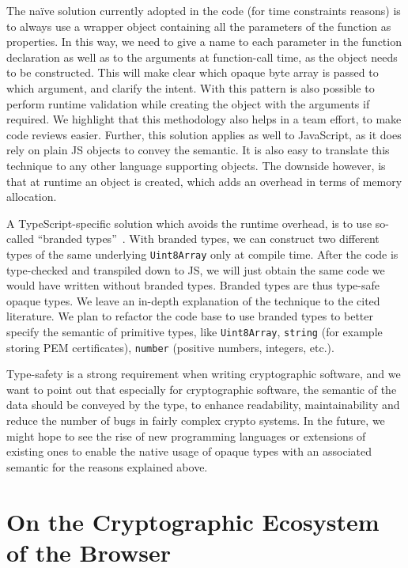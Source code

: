 The na\"ive solution currently adopted in the code (for time constraints reasons)
is to always use a wrapper object containing all the parameters of the function
as properties. In this way, we need to give a name to each parameter
in the function declaration as well as to the arguments at function-call
time, as the object needs to be constructed. This will make clear which
opaque byte array is passed to which argument, and clarify the intent.
With this pattern is also possible to perform runtime validation
while creating the object with the arguments if required.
We highlight that this methodology also helps in a team effort, to make
code reviews easier. Further, this solution applies as well to JavaScript,
as it does rely on plain JS objects to convey the semantic. It is also
easy to translate this technique to any other language supporting objects.
The downside however, is that at runtime an object is created, which adds 
an overhead in terms of memory allocation.

A TypeScript-specific solution which avoids the runtime overhead, is to use
so-called ``branded types''~\cite{vanderkam2019effective, goldberg2022learning}. 
With branded types, we can construct two 
different types of the same underlying \texttt{Uint8Array} only
at compile time. After the code is type-checked and transpiled down to JS,
we will just obtain the same code we would have written without branded types.
Branded types are thus type-safe opaque types. We leave an in-depth explanation
of the technique to the cited literature. We plan to refactor the code base
to use branded types to better specify the semantic of primitive types,
like \texttt{Uint8Array}, \texttt{string} (for example storing PEM certificates),
\texttt{number} (positive numbers, integers, etc.).

Type-safety is a strong requirement when writing
cryptographic software, and we want to point out that especially for cryptographic
software, the semantic of the data should be conveyed by the type,
to enhance readability, maintainability and reduce the number of
bugs in fairly complex crypto systems.
In the future, we
might hope to see the rise of new programming languages
or extensions of existing ones to enable the native usage
of opaque types with an associated semantic for the reasons 
explained above.

\section{On the Cryptographic Ecosystem of the Browser}\label{sc:gap-webcrypto-api}

